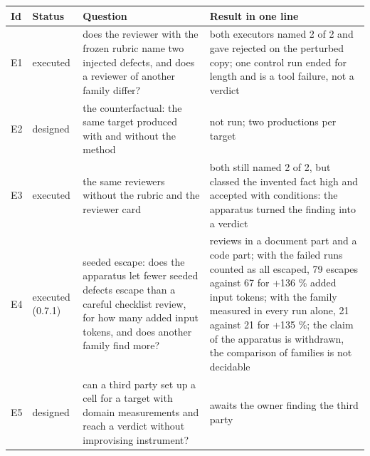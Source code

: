 \documentclass[
  american,
  10pt,
]{report}
\newcounter{none} %
\renewcommand{\texttt}[1]{{\ttfamily\hyphenchar\font=-1 #1}}
\begin{document}
{\def\LTcaptype{none} %
\begin{longtable}[]{@{}
  >{\raggedright\arraybackslash}p{}
  >{\raggedright\arraybackslash}p{}
  >{\raggedright\arraybackslash}p{}
  >{\raggedright\arraybackslash}p{}@{}}
\toprule\noalign{}
\begin{minipage}[b]{\linewidth}\raggedright
Id
\end{minipage} & \begin{minipage}[b]{\linewidth}\raggedright
Status
\end{minipage} & \begin{minipage}[b]{\linewidth}\raggedright
Question
\end{minipage} & \begin{minipage}[b]{\linewidth}\raggedright
Result in one line
\end{minipage} \\
\midrule\noalign{}
\endhead
\bottomrule\noalign{}
\endlastfoot
E1 & executed & does the reviewer with the frozen rubric name two
injected defects, and does a reviewer of another family differ? & both
executors named 2 of 2 and gave \texttt{rejected} on the perturbed copy;
one control run ended for length and is a tool failure, not a verdict \\
E2 & designed & the counterfactual: the same target produced with and
without the method & not run; two productions per target \\
E3 & executed & the same reviewers without the rubric and the reviewer
card & both still named 2 of 2, but classed the invented fact
\texttt{high} and accepted with conditions: the apparatus turned the
finding into a verdict \\
E4 & executed (0.7.1) & seeded escape: does the apparatus let fewer
seeded defects escape than a careful checklist review, for how many
added input tokens, and does another family find more? & 39 reviews in a
document part and a code part; with the failed runs counted as all
escaped, 79 escapes against 67 for +136 \% added input tokens; with the
family measured in every run alone, 21 against 21 for +135 \%; the claim
of the apparatus is withdrawn, the comparison of families is not
decidable \\
E5 & designed & can a third party set up a cell for a target with domain
measurements and reach a verdict without improvising instrument? &
awaits the owner finding the third party \\
\end{longtable}
}
\end{document}
